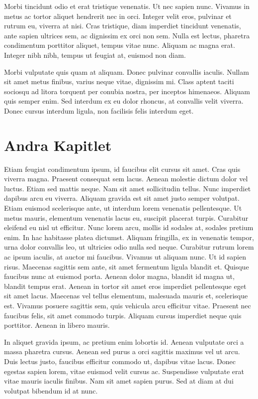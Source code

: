 \documentclass[a4paper,10pt]{article}
\begin{document}
Morbi tincidunt odio et erat tristique venenatis. Ut nec sapien nunc. Vivamus in metus ac tortor aliquet hendrerit nec in orci. Integer velit eros, pulvinar et rutrum eu, viverra at nisi. Cras tristique, diam imperdiet tincidunt venenatis, ante sapien ultrices sem, ac dignissim ex orci non sem. Nulla est lectus, pharetra condimentum porttitor aliquet, tempus vitae nunc. Aliquam ac magna erat. Integer nibh nibh, tempus ut feugiat at, euismod non diam.

Morbi vulputate quis quam at aliquam. Donec pulvinar convallis iaculis. Nullam sit amet metus finibus, varius neque vitae, dignissim mi. Class aptent taciti sociosqu ad litora torquent per conubia nostra, per inceptos himenaeos. Aliquam quis semper enim. Sed interdum ex eu dolor rhoncus, at convallis velit viverra. Donec cursus interdum ligula, non facilisis felis interdum eget.
\section{Andra Kapitlet}
Etiam feugiat condimentum ipsum, id faucibus elit cursus sit amet. Cras quis viverra magna. Praesent consequat sem lacus. Aenean molestie dictum dolor vel luctus. Etiam sed mattis neque. Nam sit amet sollicitudin tellus. Nunc imperdiet dapibus arcu eu viverra. Aliquam gravida est sit amet justo semper volutpat. Etiam euismod scelerisque ante, ut interdum lorem venenatis pellentesque. Ut metus mauris, elementum venenatis lacus eu, suscipit placerat turpis. Curabitur eleifend eu nisl ut efficitur. Nunc lorem arcu, mollis id sodales at, sodales pretium enim. In hac habitasse platea dictumst. Aliquam fringilla, ex in venenatis tempor, urna dolor convallis leo, ut ultricies odio nulla sed neque. Curabitur rutrum lorem ac ipsum iaculis, at auctor mi faucibus.
Vivamus ut aliquam nunc. Ut id sapien risus. Maecenas sagittis sem ante, sit amet fermentum ligula blandit et. Quisque faucibus nunc at euismod porta. Aenean dolor magna, blandit id magna ut, blandit tempus erat. Aenean in tortor sit amet eros imperdiet pellentesque eget sit amet lacus. Maecenas vel tellus elementum, malesuada mauris et, scelerisque est. Vivamus posuere sagittis sem, quis vehicula arcu efficitur vitae. Praesent nec faucibus felis, sit amet commodo turpis. Aliquam cursus imperdiet neque quis porttitor. Aenean in libero mauris.

In aliquet gravida ipsum, ac pretium enim lobortis id. Aenean vulputate orci a massa pharetra cursus. Aenean sed purus a orci sagittis maximus vel ut arcu. Duis lectus justo, faucibus efficitur commodo ut, dapibus vitae lacus. Donec egestas sapien lorem, vitae euismod velit cursus ac. Suspendisse vulputate erat vitae mauris iaculis finibus. Nam sit amet sapien purus. Sed at diam at dui volutpat bibendum id at nunc.
\end{document}
